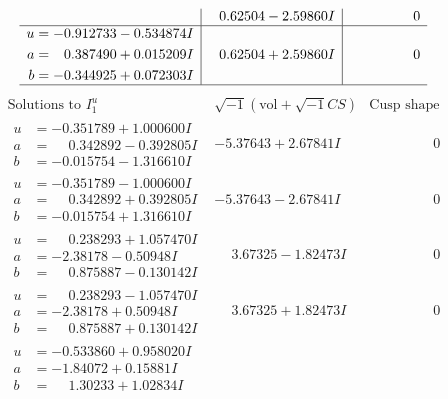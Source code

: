 \documentclass[1p]{elsarticle_modified}
\theoremstyle{definition}
\newcommand{\I}{\sqrt{-1}}
\begin{document}
$$\begin{array}{c|c|c}
 & \phantom{-}0.62504 - 2.59860 I & \phantom{-0.000000 } 0 \\ \hline\begin{aligned}
u &= -0.912733 - 0.534874 I \\
a &= \phantom{-}0.387490 + 0.015209 I \\
b &= -0.344925 + 0.072303 I\end{aligned}
 & \phantom{-}0.62504 + 2.59860 I & \phantom{-0.000000 } 0\\
 \hline 
 \end{array}$$\newpage$$\begin{array}{c|c|c}  
\text{Solutions to }I^u_{1}& \I (\text{vol} + \sqrt{-1}CS) & \text{Cusp shape}\\
 \hline 
\begin{aligned}
u &= -0.351789 + 1.000600 I \\
a &= \phantom{-}0.342892 - 0.392805 I \\
b &= -0.015754 - 1.316610 I\end{aligned}
 & -5.37643 + 2.67841 I & \phantom{-0.000000 } 0 \\ \hline\begin{aligned}
u &= -0.351789 - 1.000600 I \\
a &= \phantom{-}0.342892 + 0.392805 I \\
b &= -0.015754 + 1.316610 I\end{aligned}
 & -5.37643 - 2.67841 I & \phantom{-0.000000 } 0 \\ \hline\begin{aligned}
u &= \phantom{-}0.238293 + 1.057470 I \\
a &= -2.38178 - 0.50948 I \\
b &= \phantom{-}0.875887 - 0.130142 I\end{aligned}
 & \phantom{-}3.67325 - 1.82473 I & \phantom{-0.000000 } 0 \\ \hline\begin{aligned}
u &= \phantom{-}0.238293 - 1.057470 I \\
a &= -2.38178 + 0.50948 I \\
b &= \phantom{-}0.875887 + 0.130142 I\end{aligned}
 & \phantom{-}3.67325 + 1.82473 I & \phantom{-0.000000 } 0 \\ \hline\begin{aligned}
u &= -0.533860 + 0.958020 I \\
a &= -1.84072 + 0.15881 I \\
b &= \phantom{-}1.30233 + 1.02834 I\end{aligned}

\end{array}$$
\end{document}
